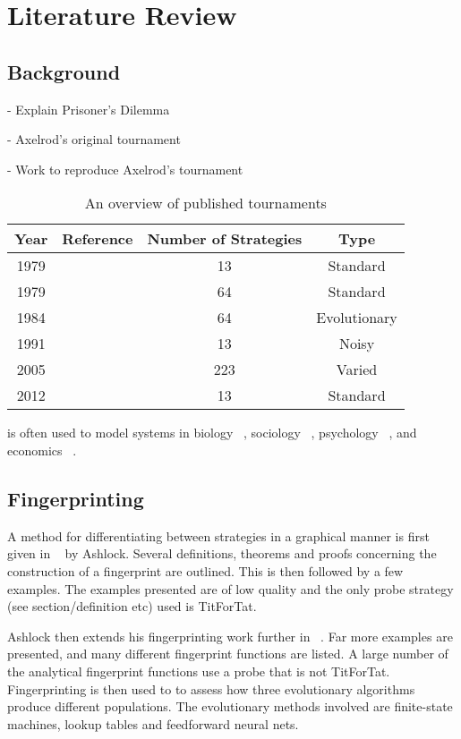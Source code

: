 
\chapter{Literature Review}\label{cha:literature_review}

\section{Background}

- Explain Prisoner's Dilemma

- Axelrod's original tournament

- Work to reproduce Axelrod's tournament ~\cite{Knight2016}

\begin{table}[htbp]
\centering
\begin{tabular}{c c c c}
Year & Reference & Number of Strategies & Type\\
\hline
1979 & & 13 & Standard\\
1979 & & 64 & Standard\\
1984 & & 64 & Evolutionary\\
1991 & & 13 & Noisy\\
2005 & & 223 & Varied\\
2012 & & 13 & Standard\\
\hline
\end{tabular}
\label{tab:tournament_refs}
\caption{An overview of published tournaments}
\end{table}

is often used to model systems in biology ~\cite{Sigmund1999}, sociology ~\cite{Franken2005},
psychology ~\cite{Ishibuchi2005}, and economics ~\cite{Chong2005}.


\section{Fingerprinting}\label{sec:fingerprinting}

A method for differentiating between strategies in a graphical manner is first given in ~\cite{Ashlock2004} by Ashlock.
Several definitions, theorems and proofs concerning the construction of a fingerprint are outlined.
This is then followed by a few examples.
The examples presented are of low quality and the only probe strategy (see section/definition etc) used is TitForTat.

Ashlock then extends his fingerprinting work further in ~\cite{Ashlock2008}.
Far more examples are presented, and many different fingerprint functions are listed.
A large number of the analytical fingerprint functions use a probe that is not TitForTat.
Fingerprinting is then used to to assess how three evolutionary algorithms produce different populations.
The evolutionary methods involved are finite-state machines, lookup tables and feedforward neural nets.


